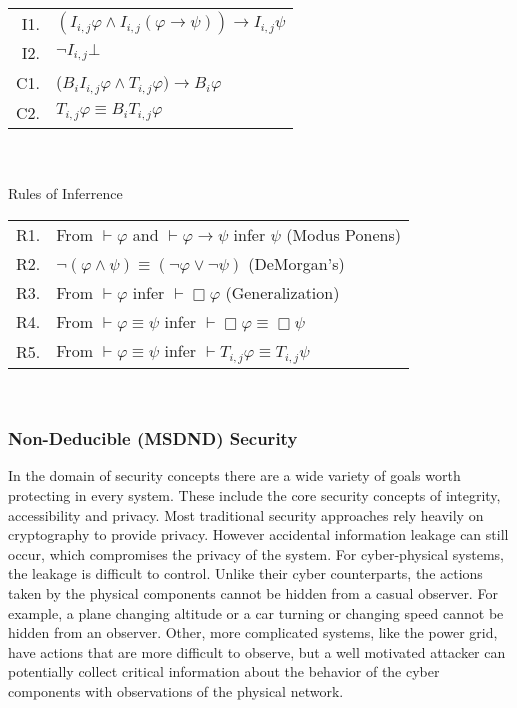 \begin{table}[!t]
\begin{tabular}{r l}
I1. & $(I_{i,j} \varphi \wedge I_{i,j} (\varphi \rightarrow \psi )) \rightarrow I_{i,j} \psi$\\
I2. & $\neg I_{i,j} \bot$ \\
C1. & ($B_i I_{i,j} \varphi \wedge T_{i,j} \varphi) \rightarrow B_i \varphi$ \\
C2. & $T_{i,j} \varphi \equiv B_i T_{i,j} \varphi$ \\
\end{tabular} \\~\\
Rules of Inferrence \\
\begin{tabular}{r l}
R1. & From $\vdash \varphi$ and $\vdash \varphi \rightarrow \psi$ infer $\psi$ (Modus Ponens) \\
R2. & $\neg (\varphi \wedge \psi) \equiv (\neg \varphi \vee \neg \psi)$ (DeMorgan's)\\
R3. & From $\vdash \varphi$ infer $\vdash \Box \varphi$ (Generalization)\\
R4. & From $\vdash \varphi \equiv \psi$ infer $\vdash \Box \varphi \equiv \Box \psi$\\
R5. & From $\vdash \varphi \equiv \psi$ infer $\vdash T_{i,j} \varphi \equiv T_{i,j} \psi$\\
\end{tabular} \\
\label{tab:axiomatic}
\end{table}

\subsubsection{Non-Deducible (MSDND) Security}

In the domain of security concepts there are a wide variety of goals worth protecting in every system. These include the core security concepts of integrity, accessibility and privacy. Most traditional security approaches rely heavily on cryptography to provide privacy. However accidental information leakage can still occur, which compromises the privacy of the system. For cyber-physical systems, the leakage is difficult to control. Unlike their cyber counterparts, the actions taken by the physical components cannot be hidden from a casual observer. For example, a plane changing altitude or a car turning or changing speed cannot be hidden from an observer. Other, more complicated systems, like the power grid, have actions that are more difficult to observe, but a well motivated attacker can potentially collect critical information about the behavior of the cyber components with observations of the physical network.

